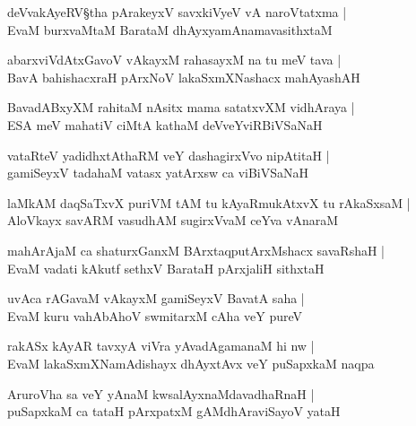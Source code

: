 \begin{shloka}
deVvakAyeRV\S tha pArakeyxV savxkiVyeV vA naroVtatxma |\\
EvaM burxvaMtaM BarataM dhAyxyamAnamavasithxtaM 
\end{shloka}

\begin{shloka}
abarxviVdAtxGavoV vAkayxM rahasayxM na tu meV tava |\\
BavA\R{} bahishacxraH pArxNoV lakaSxmXNashacx mahAyashAH 
\end{shloka}

\begin{shloka}
BavadABxyXM rahitaM nAsitx mama satatxvXM vidhAraya |\\
ESA meV mahatiV ciMtA kathaM deVveYviRBiVSaNaH 
\end{shloka}

\begin{shloka}
vataRteV yadidhxtAthaRM veY dashagirxVvo nipAtitaH |\\
gamiSeyxV tadahaM vatasx yatArxsw ca viBiVSaNaH 
\end{shloka}

\begin{shloka}
laMkAM daqSaTxvX puriVM tAM tu kAyaRmukAtxvX tu rAkaSxsaM |\\
AloVkayx savARM vasudhAM sugirxVvaM ceYva vAnaraM 
\end{shloka}

\begin{shloka}
mahArAjaM ca shaturxGanxM BArxtaqputArxMshacx savaRshaH |\\
EvaM vadati kAkutf sethxV BarataH pArxjaliH sithxtaH 
\end{shloka}

\begin{shloka}
uvAca rAGavaM vAkayxM gamiSeyxV BavatA saha |\\
EvaM kuru vahAbAhoV swmitarxM cAha veY pureV 
\end{shloka}

\begin{shloka}
rakASx kAyAR tavxyA viVra yAvadAgamanaM hi nw |\\
EvaM lakaSxmXNamAdishayx dhAyxtAvx veY puSapxkaM naqpa
\end{shloka}

\begin{shloka}
AruroVha sa veY yAnaM kwsalAyxnaMdavadhaRnaH |\\
puSapxkaM ca tataH pArxpatxM gAMdhAraviSayoV yataH 
\end{shloka}

